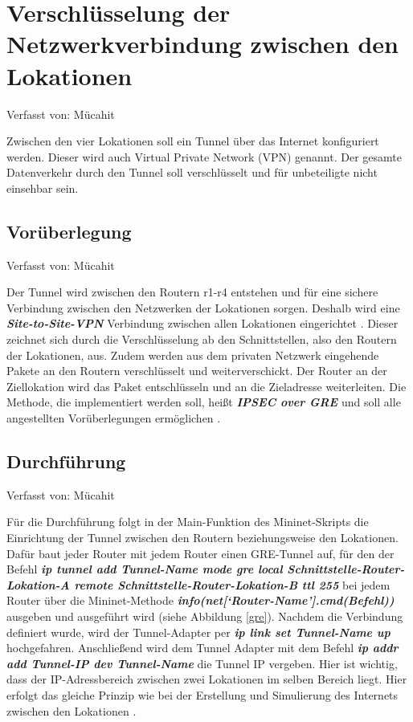 \documentclass[fontsize=12pt,paper=a4,open=any,parskip=half,
  twoside=false,toc=listof,toc=bibliography,fleqn,leqno,
  captions=nooneline,captions=tableabove,british]{scrbook}
\begin{document}
\newpage
\section{Verschlüsselung der Netzwerkverbindung zwischen den Lokationen}
{\tiny Verfasst von: Mücahit\par}
Zwischen den vier Lokationen soll ein Tunnel über das Internet konfiguriert werden. Dieser wird auch Virtual Private Network (VPN) genannt. Der gesamte Datenverkehr durch den Tunnel soll verschlüsselt und für unbeteiligte nicht einsehbar sein.

\subsection{Vorüberlegung}
{\tiny Verfasst von: Mücahit\par}
Der Tunnel wird zwischen den Routern r1-r4 entstehen und für eine sichere Verbindung zwischen den Netzwerken der Lokationen sorgen. Deshalb wird eine \textit{\textbf{Site-to-Site-VPN}} Verbindung zwischen allen Lokationen eingerichtet \cite{sitetosite}. Dieser zeichnet sich durch die Verschlüsselung ab den Schnittstellen, also den Routern der Lokationen, aus. Zudem werden aus dem privaten Netzwerk eingehende Pakete an den Routern verschlüsselt und weiterverschickt. Der Router an der Ziellokation wird das Paket entschlüsseln und an die Zieladresse weiterleiten. Die Methode, die implementiert werden soll, heißt \textit{\textbf{IPSEC over GRE}} und soll alle angestellten Vorüberlegungen ermöglichen \cite{vpntunnel}.

\subsection{Durchführung}
{\tiny Verfasst von: Mücahit\par}
Für die Durchführung folgt in der Main-Funktion des Mininet-Skripts die Einrichtung der Tunnel zwischen den Routern beziehungsweise den Lokationen. Dafür baut jeder Router mit jedem Router einen GRE-Tunnel auf, für den der Befehl \textit{\textbf{ip tunnel add Tunnel-Name mode gre local Schnittstelle\hyp{}Router\hyp{}Lokation\hyp{}A remote Schnittstelle\hyp{}Router\hyp{}Lokation\hyp{}B ttl 255}} bei jedem Router über die Mininet-Methode \textit{\textbf{info(net[‘Router\hyp{}Name'].cmd(Befehl))}} ausgeben und ausgeführt wird (siehe Abbildung \ref{gre}). Nachdem die Verbindung definiert wurde, wird der Tunnel-Adapter per \textit{\textbf{ip link set Tunnel-Name up}} hochgefahren. Anschließend wird dem Tunnel Adapter mit dem Befehl \textit{\textbf{ip addr add Tunnel-IP dev Tunnel-Name}} die Tunnel IP vergeben. Hier ist wichtig, dass der IP-Adressbereich zwischen zwei Lokationen im selben Bereich liegt. Hier erfolgt das gleiche Prinzip wie bei der Erstellung und Simulierung des Internets zwischen den Lokationen \cite{tunnelimpl}.
\end{document}
